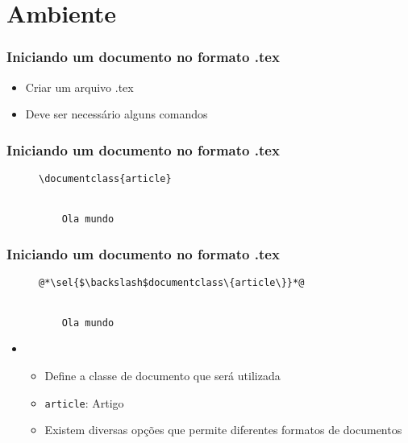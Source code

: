 \section{Ambiente}

\begin{frame} \frametitle{Iniciando um documento no formato .tex}
\begin{itemize}
	\item Criar um arquivo .tex
	\item Deve ser necessário alguns comandos
\end{itemize}
\end{frame}

\begin{frame}[fragile] \frametitle{Iniciando um documento no formato .tex}
\begin{figure}[!t]
\begin{lstlisting}
\documentclass{article}


	Ola mundo

\end{lstlisting}
\end{figure}
\end{frame}

\begin{frame}[fragile] \frametitle{Iniciando um documento no formato .tex}
\begin{figure}[!t]
\begin{lstlisting}
@*\sel{$\backslash$documentclass\{article\}}*@


	Ola mundo

\end{lstlisting}
\end{figure}

\begin{itemize}
	\item {}
	\begin{itemize}
		\item Define a classe de documento que será utilizada
		\item \texttt{article}: Artigo
		\item Existem diversas opções que permite diferentes formatos de documentos
	\end{itemize}
\end{itemize}

\end{frame}


